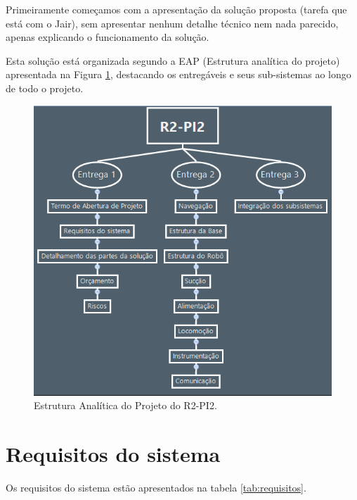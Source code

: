 Primeiramente começamos com a apresentação da solução proposta (tarefa que está com o Jair), sem apresentar nenhum detalhe técnico nem nada parecido, apenas explicando o funcionamento da solução. 

Esta solução está organizada segundo a EAP (Estrutura analítica do projeto) apresentada na Figura \ref{img:eap}, destacando os entregáveis e seus sub-sistemas ao longo de todo o projeto.

\begin{figure}[H]
	\centering
	\includegraphics[scale=0.55]{figuras/eap.png}
	\caption{Estrutura Analítica do Projeto do R2-PI2.}
	\label{img:eap}
\end{figure}

\section{Requisitos do sistema} %
\label{sub:requisitos_do_sistema}

Os requisitos do sistema estão apresentados na tabela \ref{tab:requisitos}.


